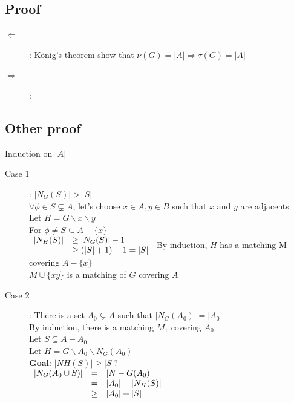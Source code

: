         \subsection{Proof}
            \begin{description}
                \item[$\Leftarrow$]: König's theorem show that $\nu(G)=|A| \Rightarrow \tau(G)=|A|$
                \item[$\Rightarrow$]:
            \end{description}
        \subsection{Other proof}
            Induction on $|A|$\\
            \begin{description}
                \item[Case 1]: $|N_{G}(S)|>|S|$\\
                    $\forall \phi \in S\subsetneq A$, let's choose $x\in A, y\in B$ such that $x$ and $y$ are adjacents\\
                    Let $H=G\backslash x\backslash y$\\
                    For $\phi\neq S\subseteq A-\{x\}$\\
                    $\begin{array}{r l}
                        |N_{H}(S)|&\geq|N_{G}(S)|-1\\
                        &\geq(|S|+1)-1=|S|
                    \end{array}$
                    By induction, $H$ has a matching M covering $A-\{x\}$\\
                    $M\cup\{xy\}$ is a matching of $G$ covering $A$
                \item[Case 2]: There is a set $A_0\subsetneq A$ such that $|N_{G}(A_0)|=|A_0|$\\
                    By induction, there is a matching $M_1$ covering $A_0$\\
                    Let $S\subseteq A-A_0$\\
                    Let $H=G\backslash A_0 \backslash N_{G}(A_0)$\\
                    \textbf{Goal}: $|N{H}(S)|\geq|S|$?\\
                    $\begin{array}{r c l}
                        |N_G(A_0\cup S)|&=&|N-G(A_0)|\\
                        &=&|A_0|+|N_H(S)|\\
                        &\geq&|A_0|+|S|
                    \end{array}$
            \end{description}
